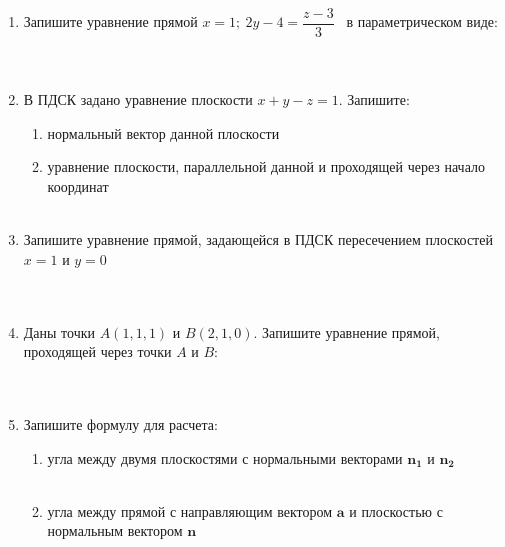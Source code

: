\begin{enumerate}
	\item Запишите уравнение прямой $x = 1; \ 2y-4 = \dfrac{z-3}{3} $ \ в параметрическом виде:\\ \\ \\
        
    \item В ПДСК задано уравнение плоскости $x + y - z = 1$. Запишите: 
        \begin{enumerate}[itemsep=1cm]
            \item нормальный вектор данной плоскости
            \item уравнение плоскости, параллельной данной и проходящей через начало координат \\ \\ 
        \end{enumerate}
    \item Запишите уравнение прямой, задающейся в ПДСК пересечением плоскостей $x = 1$ и $y = 0$ \\ \\ \\
  
    
    \item Даны точки $A(1, 1, 1)$ и $B(2, 1, 0)$. Запишите уравнение прямой, проходящей через точки $A$ и $B$: \\ \\ \\
    
    \item Запишите формулу для расчета:
         \begin{enumerate}[itemsep=1cm]
            \item угла между двумя плоскостями с нормальными векторами $\mathbf{n_1}$ и $\mathbf{n_2}$\\ \\
            \item угла между прямой с направляющим вектором $\mathbf{a}$ и плоскостью с нормальным вектором $\mathbf{n}$ \\ \\ 
        \end{enumerate}

\end{enumerate}